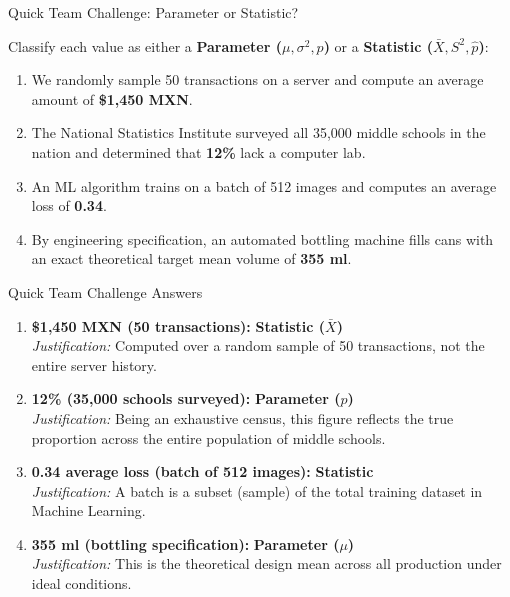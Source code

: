\documentclass[aspectratio=169,xcolor={dvipsnames,table}]{beamer}
\begin{document}
\begin{frame}{Quick Team Challenge: Parameter or Statistic?}
  \begin{retoclase}
    Classify each value as either a \textbf{Parameter ($\mu, \sigma^2, p$)} or a \textbf{Statistic ($\bar{X}, S^2, \hat{p}$)}:
  \end{retoclase}
  
  \vspace{0.5em}
  \begin{enumerate}
    \item We randomly sample 50 transactions on a server and compute an average amount of \textbf{\$1,450 MXN}. \pause
    \item The National Statistics Institute surveyed all 35,000 middle schools in the nation and determined that \textbf{12\%} lack a computer lab. \pause
    \item An ML algorithm trains on a batch of 512 images and computes an average loss of \textbf{0.34}. \pause
    \item By engineering specification, an automated bottling machine fills cans with an exact theoretical target mean volume of \textbf{355 ml}.
  \end{enumerate}
\end{frame}

\begin{frame}{Quick Team Challenge Answers}
  \begin{enumerate}
    \item \textbf{\$1,450 MXN (50 transactions):} \color{TecAzulOscuro}\textbf{Statistic ($\bar{X}$)}\color{black} \pause
       \\ \small \textit{Justification:} Computed over a random sample of 50 transactions, not the entire server history. \pause
    \item \textbf{12\% (35,000 schools surveyed):} \color{TecRojo}\textbf{Parameter ($p$)}\color{black} \pause
       \\ \small \textit{Justification:} Being an exhaustive census, this figure reflects the true proportion across the entire population of middle schools. \pause
    \item \textbf{0.34 average loss (batch of 512 images):} \color{TecAzulOscuro}\textbf{Statistic}\color{black} \pause
       \\ \small \textit{Justification:} A batch is a subset (sample) of the total training dataset in Machine Learning. \pause
    \item \textbf{355 ml (bottling specification):} \color{TecRojo}\textbf{Parameter ($\mu$)}\color{black} \pause
       \\ \small \textit{Justification:} This is the theoretical design mean across all production under ideal conditions.
  \end{enumerate}
\end{frame}
\end{document}
